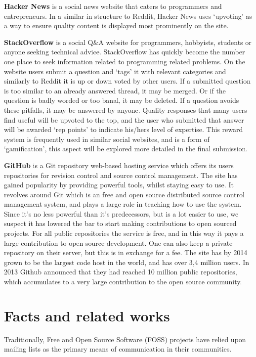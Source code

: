 \documentclass[a4paper,11pt]{article} %
\begin{document}
\textbf{Hacker News} is a social news website that caters to programmers and
entrepreneurs. In a similar in structure to Reddit, Hacker News uses
‘upvoting’ as a way to ensure quality content is displayed most prominently
on the site.


\textbf{StackOverflow} is a social Q\&A website for programmers, hobbyists,
students or anyone seeking technical advice. StackOverflow has quickly
become the number one place to seek information related to programming
related problems. On the website users submit a question and ‘tags’ it with
relevant categories and similarly to Reddit it is up or down voted by other
users. If a submitted question is too similar to an already answered thread,
it may be merged. Or if the question is badly worded or too banal, it may be
deleted. If a question avoids these pitfalls, it may be answered by
anyone. Quality responses that many users find useful will be upvoted to the
top, and the user who submitted that answer will be awarded ‘rep points’ to
indicate his/hers level of expertise. This reward system is frequently used
in similar social websites, and is a form of ‘gamification’, this aspect
will be explored more detailed in the final submission.


\textbf{GitHub} is a Git repository web-based hosting service which offers
its users repositories for revision control and source control
management. The site has gained popularity by providing powerful tools,
whilst staying easy to use. It revolves around Git which is an free and open
source distributed source control management system, and plays a large role
in teaching how to use the system. Since it’s no less powerful than it’s
predecessors, but is a lot easier to use, we suspect it has lowered the bar
to start making contributions to open sourced projects. For all public
repositories the service is free, and in this way it pays a large
contribution to open source development. One can also keep a private
repository on their server, but this is in exchange for a fee. The site has
by 2014 grown to be the largest code host in the world, and has over 3,4
million users. In 2013 Github announced that they had reached 10 million
public repositories, which accumulates to a very large contribution to the
open source community.

\section{Facts and related works}

Traditionally, Free and Open Source Software (FOSS) projects have
relied upon mailing lists as the primary means of communication in
their communities. %
\end{document}
